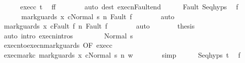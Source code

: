 \begin{isabellebody}
\ \ \ \ \isamarkupfalse%
\ exec{\isacharunderscore}c{}\ t\ \isamarkupfalse%
\ {\isachardoublequoteopen}f{\isacharprime}{\isacharequal}f{\isachardoublequoteclose}\isanewline
\ \ \ \ \ \ \isamarkupfalse%
\ {\isacharparenleft}auto\ dest{\isacharcolon}\ execn{\isacharunderscore}Fault{\isacharunderscore}end{\isacharparenright}\isanewline
\ \ \ \ \isamarkupfalse%
\ Fault\ Seq{\isachardot}hyps\ \isamarkupfalse%
\ f{\isacharprime}{\isacharprime}\ \isanewline
\ \ \ \ \ \ {\isachardoublequoteopen}{\isasymGamma}{\isasymturnstile}{\isasymlangle}mark{\isacharunderscore}guards\ x\ c{}{\isacharcomma}Normal\ s{\isasymrangle}\ {\isacharequal}n{\isasymRightarrow}\ Fault\ f{\isacharprime}{\isacharprime}{\isachardoublequoteclose}\isanewline
\ \ \ \ \ \ \isamarkupfalse%
\ auto\isanewline
\ \ \ \ \isamarkupfalse%
\ \isamarkupfalse%
\ {\isachardoublequoteopen}{\isasymGamma}{\isasymturnstile}{\isasymlangle}mark{\isacharunderscore}guards\ x\ c{}{\isacharcomma}Fault\ f{\isacharprime}{\isacharprime}{\isasymrangle}\ {\isacharequal}n{\isasymRightarrow}\ Fault\ f{\isacharprime}{\isacharprime}{\isachardoublequoteclose}\isanewline
\ \ \ \ \ \ \isamarkupfalse%
\ auto\isanewline
\ \ \ \ \isamarkupfalse%
\ \isamarkupfalse%
\ {\isacharquery}thesis\isanewline
\ \ \ \ \ \ \isamarkupfalse%
\ {\isacharparenleft}auto\ intro{\isacharcolon}\ execn{\isachardot}intros{\isacharparenright}\isanewline
\ \ \isamarkupfalse%
\isanewline
\ \ \ \ \isamarkupfalse%
\ {\isacharparenleft}Normal\ s{\isacharprime}{\isacharparenright}\isanewline
\ \ \ \ \isamarkupfalse%
\ execn{\isacharunderscore}to{\isacharunderscore}execn{\isacharunderscore}mark{\isacharunderscore}guards\ {\isacharbrackleft}OF\ exec{\isacharunderscore}c{}{\isacharbrackright}\ \isanewline
\ \ \ \ \isamarkupfalse%
\ exec{\isacharunderscore}mark{\isacharunderscore}c{}{\isacharcolon}\ {\isachardoublequoteopen}{\isasymGamma}{\isasymturnstile}{\isasymlangle}mark{\isacharunderscore}guards\ x\ c{}{\isacharcomma}Normal\ s{\isasymrangle}\ {\isacharequal}n{\isasymRightarrow}\ w{\isachardoublequoteclose}\isanewline
\ \ \ \ \ \ \isamarkupfalse%
\ simp\isanewline
\ \ \ \ \isamarkupfalse%
\ Seq{\isachardot}hyps\ t\ \isamarkupfalse%
\ f{\isacharprime}\ \isanewline

\end{isabellebody}
